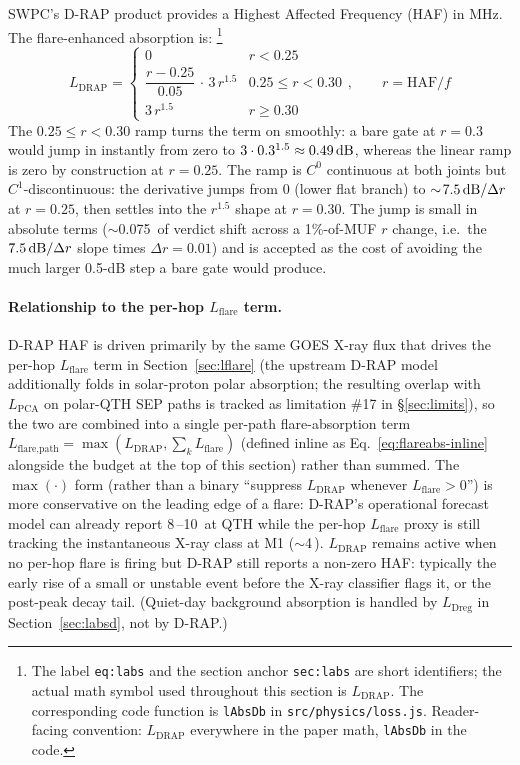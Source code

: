 \documentclass[11pt,a4paper]{article}
\newcommand{\SI}[2]{#1\,\text{#2}}
\newcommand{\dB}{\text{dB}}
\begin{document}
SWPC's D-RAP product provides a Highest Affected Frequency (HAF) in
MHz.  The flare-enhanced absorption is:%
\footnote{The label \texttt{eq:labs} and the section anchor
\texttt{sec:labs} are short identifiers; the actual
math symbol used throughout this section is $L_{\text{DRAP}}$.
The corresponding code function is \texttt{lAbsDb} in
\texttt{src/physics/loss.js}.  Reader-facing convention:
$L_{\text{DRAP}}$ everywhere in the paper math, \texttt{lAbsDb}
in the code.}
\begin{equation}\label{eq:labs}
  L_{\text{DRAP}} =
  \begin{cases}
    0 & r < 0.25 \\[3pt]
    \dfrac{r - 0.25}{0.05}\,\cdot\,3\,r^{1.5}
      & 0.25 \le r < 0.30 \\[6pt]
    3\,r^{1.5} & r \ge 0.30
  \end{cases},\qquad r = \text{HAF}/f
\end{equation}
The $0.25 \le r < 0.30$ ramp turns the term on smoothly: a bare
gate at $r = 0.3$ would jump in instantly from zero to
$3 \cdot 0.3^{1.5} \approx \SI{0.49}{\dB}$, whereas the linear
ramp is zero by construction at $r = 0.25$.  The ramp is $C^0$
continuous
at both joints but $C^1$-discontinuous: the derivative jumps from
$0$ (lower flat branch) to $\sim\!\SI{7.5}{\dB}/\Delta r$ at
$r = 0.25$, then settles into the $r^{1.5}$ shape at $r = 0.30$.
The jump is small in absolute terms ($\sim$\SI{0.075}{\dB} of
verdict shift across a 1\%-of-MUF $r$ change, i.e.\ the
$\SI{7.5}{\dB}/\Delta r$ slope times $\Delta r = 0.01$) and is
accepted as
the cost of avoiding the much larger 0.5-dB step a bare gate
would produce.

\paragraph{Relationship to the per-hop $L_{\text{flare}}$ term.}  D-RAP
HAF is driven primarily by the same GOES X-ray flux that drives
the per-hop $L_{\text{flare}}$ term in Section~\ref{sec:lflare}
(the upstream D-RAP model additionally folds in solar-proton polar
absorption; the resulting overlap with $L_{\text{PCA}}$ on
polar-QTH SEP paths is tracked as limitation \#17 in
\S\ref{sec:limits}), so
the two are combined into a single per-path flare-absorption term
$L_{\text{flare,path}} = \max(L_{\text{DRAP}}, \sum_k L_{\text{flare}})$
(defined inline as Eq.~\ref{eq:flareabs-inline} alongside the budget
at the top of this section) rather than summed.
The $\max(\cdot)$ form (rather than a binary ``suppress
$L_{\text{DRAP}}$ whenever $L_{\text{flare}} > 0$'') is more
conservative on the leading edge of a flare: D-RAP's operational
forecast model can already report \SI{8}{\dB}--\SI{10}{\dB} at QTH while
the per-hop $L_{\text{flare}}$ proxy is still tracking the
instantaneous X-ray class at M1 ($\sim$\SI{4}{\dB}). $L_{\text{DRAP}}$
remains active when no per-hop flare is firing but D-RAP still
reports a non-zero HAF: typically the early rise of a small or
unstable event before the X-ray classifier flags it, or the
post-peak decay tail. (Quiet-day background absorption is handled by
$L_{\text{Dreg}}$ in Section~\ref{sec:labsd}, not by D-RAP.)
\end{document}
